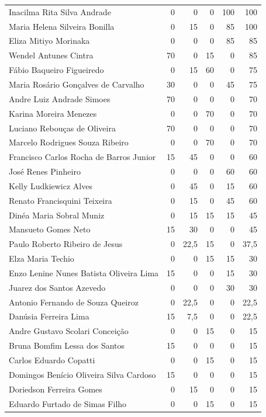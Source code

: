 \documentclass[12pt,brazil]{article}\usepackage[]{graphicx}\usepackage[]{xcolor}
\begin{document}
\begin{longtable}{lrrrrr}
Inacilma Rita Silva Andrade & 0 & 0 & 0 & 100 & 100 \\
Maria Helena Silveira Bonilla & 0 & 15 & 0 & 85 & 100 \\
Eliza Mitiyo Morinaka & 0 & 0 & 0 & 85 & 85 \\
Wendel Antunes Cintra & 70 & 0 & 15 & 0 & 85 \\
Fábio Baqueiro Figueiredo & 0 & 15 & 60 & 0 & 75 \\
Maria Rosário Gonçalves de Carvalho & 30 & 0 & 0 & 45 & 75 \\
Andre Luiz Andrade Simoes & 70 & 0 & 0 & 0 & 70 \\
Karina Moreira Menezes & 0 & 0 & 70 & 0 & 70 \\
Luciano Rebouças de Oliveira & 70 & 0 & 0 & 0 & 70 \\
Marcelo Rodrigues Souza Ribeiro & 0 & 0 & 70 & 0 & 70 \\
Francisco Carlos Rocha de Barros Junior & 15 & 45 & 0 & 0 & 60 \\
José Renes Pinheiro & 0 & 0 & 0 & 60 & 60 \\
Kelly Ludkiewicz Alves & 0 & 45 & 0 & 15 & 60 \\
Renato Francisquini Teixeira & 0 & 15 & 0 & 45 & 60 \\
Dinéa Maria Sobral Muniz & 0 & 15 & 15 & 15 & 45 \\
Mansueto Gomes Neto & 15 & 30 & 0 & 0 & 45 \\
Paulo Roberto Ribeiro de Jesus & 0 & 22,5 & 15 & 0 & 37,5 \\
Elza Maria Techio & 0 & 0 & 15 & 15 & 30 \\
Enzo Lenine Nunes Batista Oliveira Lima & 15 & 0 & 0 & 15 & 30 \\
Juarez dos Santos Azevedo & 0 & 0 & 0 & 30 & 30 \\
Antonio Fernando de Souza Queiroz & 0 & 22,5 & 0 & 0 & 22,5 \\
Danúsia Ferreira Lima & 15 & 7,5 & 0 & 0 & 22,5 \\
Andre Gustavo Scolari Conceição & 0 & 0 & 15 & 0 & 15 \\
Bruna Bomfim Lessa dos Santos & 15 & 0 & 0 & 0 & 15 \\
Carlos Eduardo Copatti & 0 & 0 & 15 & 0 & 15 \\
Domingos Benício Oliveira Silva Cardoso & 15 & 0 & 0 & 0 & 15 \\
Doriedson Ferreira Gomes & 0 & 15 & 0 & 0 & 15 \\
Eduardo Furtado de Simas Filho & 0 & 0 & 15 & 0 & 15 \\

\end{longtable}
\end{document}
